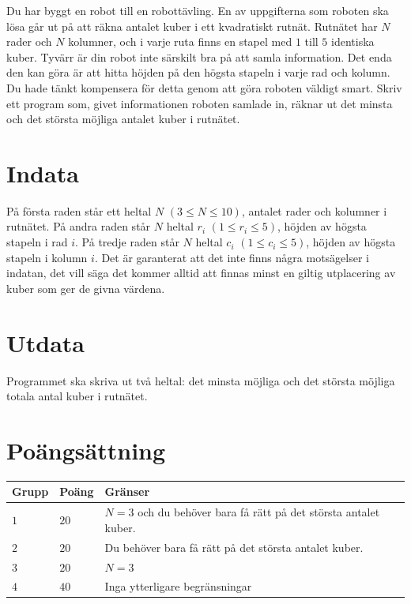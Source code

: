 \noindent
Du har byggt en robot till en robottävling. En av uppgifterna som roboten 
ska lösa går ut på att räkna antalet kuber i ett kvadratiskt rutnät. 
Rutnätet har $N$ rader och $N$ kolumner, och i varje ruta finns en 
stapel med $1$ till $5$ identiska kuber. 
Tyvärr är din robot inte särskilt bra på att samla information. 
Det enda den kan göra är att hitta höjden på den högsta stapeln i varje rad och kolumn. 
Du hade tänkt kompensera för detta genom att göra roboten väldigt smart. 
Skriv ett program som, givet informationen roboten samlade in, 
räknar ut det minsta och det största möjliga antalet kuber i rutnätet.

\section*{Indata}
På första raden står ett heltal $N$ $(3 \le N \le 10)$, antalet rader och kolumner i rutnätet. 
På andra raden står $N$ heltal $r_i$ $(1 \leq r_i \leq 5)$, 
höjden av högsta stapeln i rad $i$. På tredje raden står $N$ heltal 
$c_i$ $(1 \leq c_i \leq 5)$, höjden av högsta stapeln i kolumn $i$. 
Det är garanterat att det inte finns några motsägelser i indatan, 
det vill säga det kommer alltid att finnas minst en giltig utplacering 
av kuber som ger de givna värdena.

\section*{Utdata}
Programmet ska skriva ut två heltal: det minsta möjliga och det största möjliga totala antal kuber i rutnätet.


\section*{Poängsättning}
\noindent
\begin{tabular}{| l | l | p{12cm} |}
  \hline
  \textbf{Grupp} & \textbf{Poäng} & \textbf{Gränser} \\ \hline
  $1$    & $20$       & $N=3$ och du behöver bara få rätt på det största antalet kuber. \\ \hline
  $2$    & $20$       & Du behöver bara få rätt på det största antalet kuber. \\ \hline
  $3$    & $20$       & $N=3$ \\ \hline
  $4$    & $40$       & Inga ytterligare begränsningar \\ \hline
\end{tabular}


